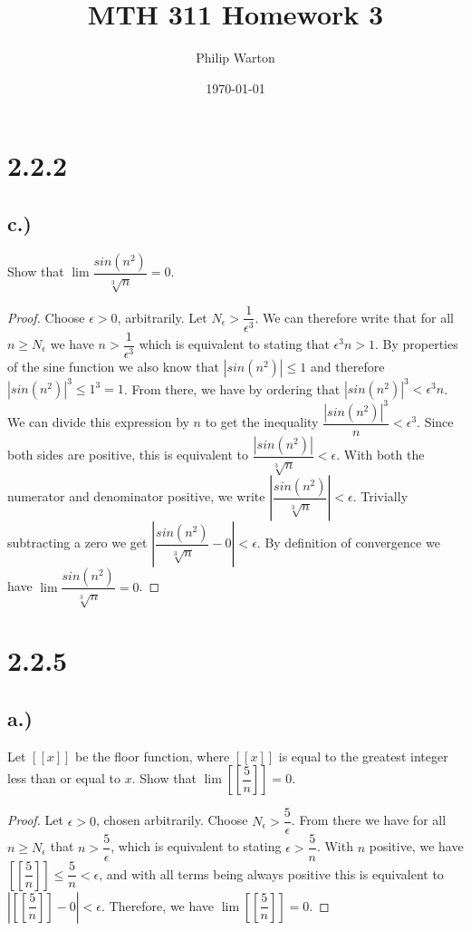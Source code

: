 \documentclass{article}
\begin{document}
\title{MTH 311 Homework 3}
\author{Philip Warton}
\date{\today}
\maketitle

\section*{2.2.2}
	\subsection*{c.)}
		Show that $\lim \dfrac{sin(n^2)}{\sqrt[3]{n}} = 0$.
		\begin{proof}
			Choose $\epsilon > 0$, arbitrarily. Let $N_\epsilon > \dfrac{1}{\epsilon^3}$.
			We can therefore write that for all $n \geqslant N_\epsilon$ we have $n > \dfrac{1}{\epsilon^3}$ which is equivalent to stating that $\epsilon^3n > 1$.
			By properties of the sine function we also know that $|sin(n^2)| \leqslant 1$ and therefore $|sin(n^2)|^3 \leqslant 1^3 = 1$.
			From there, we have by ordering that $|sin(n^2)|^3 < \epsilon^3n$.
			We can divide this expression by $n$ to get the inequality $\dfrac{|sin(n^2)|^3}{n} < \epsilon^3$.
			Since both sides are positive, this is equivalent to $\dfrac{|sin(n^2)|}{\sqrt[3]{n}} < \epsilon$.
			With both the numerator and denominator positive, we write $\left| \dfrac{sin(n^2)}{\sqrt[3]{n}} \right| < \epsilon$.
			Trivially subtracting a zero we get $\left| \dfrac{sin(n^2)}{\sqrt[3]{n}} - 0\right| < \epsilon$.
			By definition of convergence we have $\lim \dfrac{sin(n^2)}{\sqrt[3]{n}} = 0$.
	
		\end{proof}

\section*{2.2.5}
	\subsection*{a.)}
		Let $[[x]]$ be the floor function, where $[[x]]$ is equal to the greatest integer less than or equal to $x$. Show that $\lim \left[\left[\dfrac{5}{n}\right]\right]= 0$.
		\begin{proof}
			Let $\epsilon > 0$, chosen arbitrarily. Choose $N_\epsilon > \dfrac{5}{\epsilon}$.
			From there we have for all $n \geqslant N_\epsilon$ that $n > \dfrac{5}{\epsilon}$, which is equivalent to stating $\epsilon > \dfrac{5}{n}$.
			With $n$ positive, we have $\left[\left[\dfrac{5}{n}\right]\right] \leqslant \dfrac{5}{n} < \epsilon$, and with all terms being always positive this is equivalent to $\left|\left[\left[\dfrac{5}{n}\right]\right] - 0 \right| < \epsilon$.
			Therefore, we have $\lim \left[\left[\dfrac{5}{n}\right]\right]= 0$.

		\end{proof}
\end{document}
